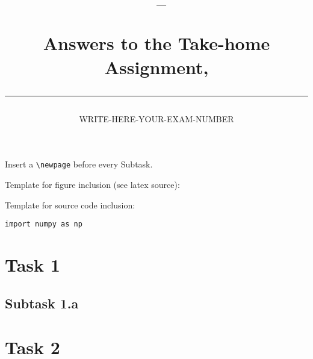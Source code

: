 \documentclass[a4paper,10pt]{article}
\author{WRITE-HERE-YOUR-EXAM-NUMBER}
\title{\begin{flushleft}
\vspace{-4ex}
\courseid~-- \coursename \\[0.2cm]
{\Large Answers to the Take-home Assignment, \term \\[3ex]
\hrule}
\end{flushleft}
}
\date{}
\begin{document}
\maketitle





Insert a \verb=\newpage= before every Subtask.

\bigskip
\bigskip
Template for figure inclusion (see latex source):

\begin{figure}[htb]
\begin{center}
\end{center}
\end{figure}


\bigskip
\bigskip
Template for source code inclusion:

\begin{lstlisting}
import numpy as np

\end{lstlisting}



\clearpage\newpage
\section*{Task 1}
\subsection*{Subtask 1.a}




\clearpage\newpage
\section*{Task 2}
\end{document}
